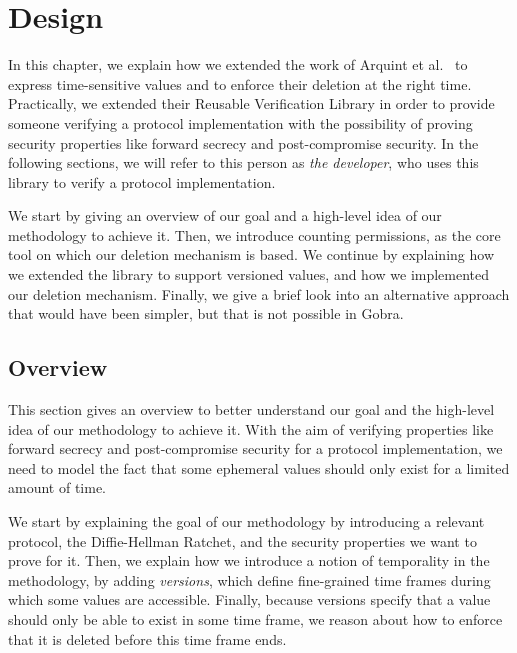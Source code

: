 
\chapter{Design}

In this chapter, we explain how we extended the work of Arquint et al.\ \cite{} to express time-sensitive values and to enforce their deletion at the right time.
Practically, we extended their Reusable Verification Library in order to provide someone verifying a protocol implementation with the possibility of proving security properties like forward secrecy and post-compromise security.
In the following sections, we will refer to this person as \emph{the developer}, who uses this library to verify a protocol implementation.

We start by giving an overview of our goal and a high-level idea of our methodology to achieve it.
Then, we introduce counting permissions, as the core tool on which our deletion mechanism is based.
We continue by explaining how we extended the library to support versioned values, and how we implemented our deletion mechanism.
Finally, we give a brief look into an alternative approach that would have been simpler, but that is not possible in Gobra.

\section{Overview}
\label{sec:overview}

This section gives an overview to better understand our goal and the high-level idea of our methodology to achieve it.
With the aim of verifying properties like forward secrecy and post-compromise security for a protocol implementation, we need to model the fact that some ephemeral values should only exist for a limited amount of time.

We start by explaining the goal of our methodology by introducing a relevant protocol, the Diffie-Hellman Ratchet, and the security properties we want to prove for it.
Then, we explain how we introduce a notion of temporality in the methodology, by adding  \emph{versions}, which define fine-grained time frames during which some values are accessible.
Finally, because versions specify that a value should only be able to exist in some time frame, we reason about how to enforce that it is deleted before this time frame ends.

